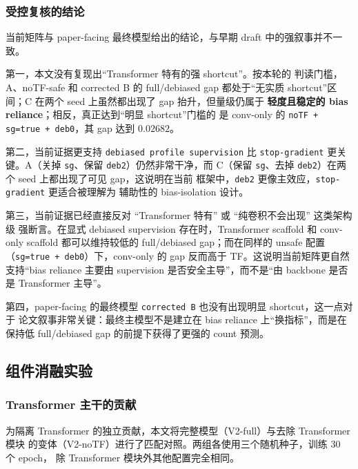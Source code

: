 \documentclass[11pt,a4paper]{ctexart}
\begin{document}
\subsubsection{受控复核的结论}

当前矩阵与 paper-facing 最终模型给出的结论，与早期 draft 中的强叙事并不一致。

第一，本文没有复现出“Transformer 特有的强 shortcut”。按本轮的
判读门槛，A、noTF-safe 和 corrected B 的 full/debiased gap 都处于“无实质
shortcut”区间；C 在两个 seed 上虽然都出现了 gap 抬升，但量级仍属于
\textbf{轻度且稳定的 bias reliance}；相反，真正达到“明显 shortcut”门槛的
是 conv-only 的 \texttt{noTF + sg=true + deb0}，其 gap 达到 $0.02682$。

第二，当前证据更支持 \texttt{debiased profile supervision} 比 \texttt{stop-gradient}
更关键。A（关掉 \texttt{sg}、保留 \texttt{deb2}）仍然非常干净，而 C（保留
\texttt{sg}、去掉 \texttt{deb2}）在两个 seed 上都出现了可见 gap，这说明在当前
框架中，\texttt{deb2} 更像主效应，\texttt{stop-gradient} 更适合被理解为
辅助性的 bias-isolation 设计。

第三，当前证据已经直接反对 “Transformer 特有” 或 “纯卷积不会出现” 这类架构级
强断言。在显式 debiased supervision 存在时，Transformer scaffold 和 conv-only
scaffold 都可以维持较低的 full/debiased gap；而在同样的 unsafe 配置
（\texttt{sg=true + deb0}）下，conv-only 的 gap 反而高于 TF。这说明当前矩阵更自然
支持“bias reliance 主要由 supervision 是否安全主导”，而不是“由 backbone 是否是
Transformer 主导”。

第四，paper-facing 的最终模型 \texttt{corrected B} 也没有出现明显 shortcut，这一点对于
论文叙事非常关键：最终主模型不是建立在 bias reliance 上“换指标”，而是在保持低
full/debiased gap 的前提下获得了更强的 count 预测。

\subsection{组件消融实验}
\label{sec:component-ablation}

\subsubsection{Transformer 主干的贡献}

为隔离 Transformer 的独立贡献，本文将完整模型（V2-full）与去除 Transformer 模块
的变体（V2-noTF）进行了匹配对照。两组各使用三个随机种子，训练 30 个 epoch，
除 Transformer 模块外其他配置完全相同。
\end{document}
